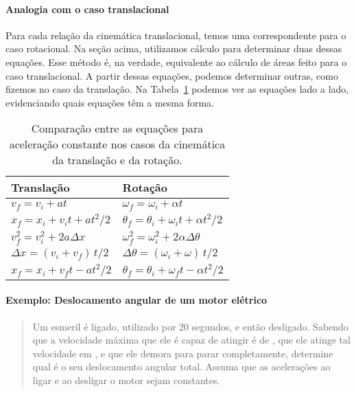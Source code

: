 \paragraph{Analogia com o caso translacional}

Para cada relação da cinemática translacional, temos uma correspondente para o caso rotacional. Na seção acima, utilizamos cálculo para determinar duas dessas equações. Esse método é, na verdade, equivalente ao cálculo de áreas feito para o caso translacional. A partir dessas equações, podemos determinar outras, como fizemos no caso da translação. Na Tabela~\ref{Tab:CompEqsTransRot} podemos ver as equações lado a lado, evidenciando quais equações têm a mesma forma.

\begin{table}[!h]
\centering
\caption{Comparação entre as equações para aceleração constante nos casos da cinemática da translação e da rotação.\label{Tab:CompEqsTransRot}}
\begin{tabular}{ll}
\toprule
Translação & Rotação \\
\midrule
$v_f = v_i + at$ & $\omega_f = \omega_i + \alpha t$ \\
$x_f = x_i + v_i t + at^2 /2$ & $\theta_f = \theta_i + \omega_i t + \alpha t^2 / 2$ \\
$v_f^2 = v_i^2 + 2 a \Delta x$ & $\omega_f^2 = \omega_i^2 + 2\alpha \Delta\theta$ \\
$\Delta x = (v_i + v_f)\, t/2$ & $\Delta\theta = (\omega_i + \omega) \, t / 2$ \\
$x_f = x_i + v_ft - at^2 / 2$ & $\theta_f = \theta_i + \omega_f t - \alpha t^2 / 2$ \\
\bottomrule
\end{tabular}
\end{table}

\paragraph{Exemplo: Deslocamento angular de um motor elétrico}

\begin{quote}
    Um esmeril é ligado, utilizado por 20 segundos, e então desligado. Sabendo que a velocidade máxima que ele é capaz de atingir é de , que ele atinge tal velocidade em , e que ele demora  para parar completamente, determine qual é o seu deslocamento angular total. Assuma que as acelerações ao ligar e ao desligar o motor sejam constantes.
\end{quote}

